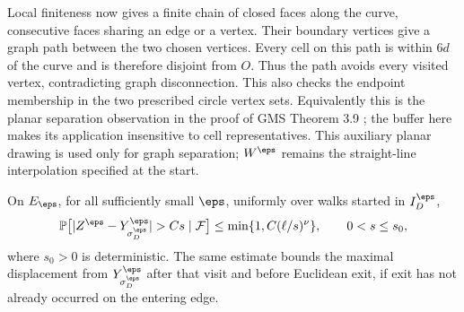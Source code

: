 Local finiteness now gives a finite chain of closed faces
along the curve, consecutive faces sharing an edge or a
vertex. Their boundary vertices give a graph path between
the two chosen vertices. Every cell on this path is within
$6d$ of the curve and is therefore disjoint from $O$.
Thus the path avoids every visited vertex, contradicting
graph disconnection. This also checks the endpoint
membership in the two prescribed circle vertex sets.
Equivalently this is the planar separation
observation in the proof of GMS Theorem 3.9 \cite[p.~32, immediately
before (3.38)]{gms-harmonic}; the buffer here makes its application insensitive
to cell representatives. This auxiliary planar drawing is
used only for graph separation; $W^\eps$ remains the
straight-line interpolation specified at the start.

\begin{lemma}\label{lem:l36-excursion}
On $E_\eps$, for all sufficiently small $\eps$, uniformly
over walks started in $I_D^\eps$,
\begin{equation}\label{eq:l36-spatial-tail}
 \mathbb{P}\bigl[|Z^\eps-Y^\eps_{\sigma_D^\eps}|>C s\mid\mathcal F\bigr]
 \le \min\{1,C(\ell/s)^\nu\},\qquad 0<s\le s_0,
\end{equation}
where $s_0>0$ is deterministic. The same estimate bounds the
maximal displacement from $Y^\eps_{\sigma_D^\eps}$ after that
visit and before Euclidean exit, if exit has not already
occurred on the entering edge.
\end{lemma}
